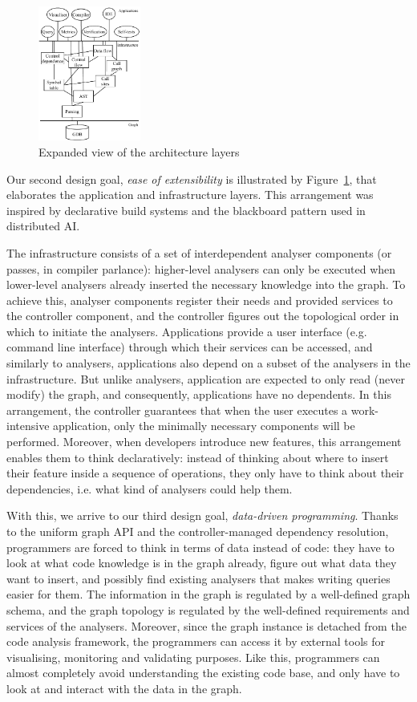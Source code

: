 \documentclass[sigconf]{acmart}
\begin{document}
  \begin{figure}
    \includegraphics[width=0.3\textwidth]{figures/arch-deps.pdf}
    \caption{Expanded view of the architecture layers}\label{fig:arch-deps}
  \end{figure}

Our second design goal, \textit{ease of extensibility} is illustrated by Figure~\ref{fig:arch-deps}, that elaborates the application and infrastructure layers. 
This arrangement was inspired by declarative build systems and the blackboard pattern used in distributed AI.

The infrastructure consists of a set of interdependent analyser components (or passes, in compiler parlance): higher-level analysers can only be executed when lower-level analysers already inserted the necessary knowledge into the graph. To achieve this, analyser components register their needs and provided services to the controller component, and the controller figures out the topological order in which to initiate the analysers. 
Applications provide a user interface (e.g. command line interface) through which their services can be accessed, and similarly to analysers, applications also depend on a subset of the analysers in the infrastructure. But unlike analysers, application are expected to only read (never modify) the graph, and consequently, applications have no dependents. 
In this arrangement, the controller guarantees that when the user executes a work-intensive application, only the minimally necessary components will be performed.
Moreover, when developers introduce new features, this arrangement enables them to think declaratively: instead of thinking about where to insert their feature inside a sequence of operations, they only have to think about their dependencies, i.e. what kind of analysers could help them.

With this, we arrive to our third design goal, \textit{data-driven programming}. Thanks to the uniform graph API and the controller-managed dependency resolution, programmers are forced to think in terms of data instead of code: they have to look at what code knowledge is in the graph already, figure out what data they want to insert, and possibly find existing analysers that makes writing queries  easier for them. 
The information in the graph is regulated by a well-defined graph schema, and the graph topology is regulated by the well-defined requirements and services of the analysers. Moreover, since the graph instance is detached from the code analysis framework, the programmers can access it by external tools for visualising, monitoring and validating purposes.
Like this, programmers can almost completely avoid understanding the existing code base, and only have to look at and interact with the data in the graph.  
\end{document}
